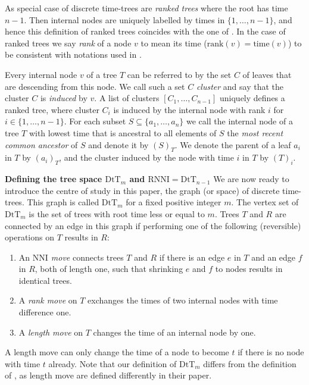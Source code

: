 \documentclass[11pt]{amsart}
\newcommand{\rnni}{\mathrm{RNNI}}
\newcommand{\rank}{\mathrm{rank}}
\newcommand{\ntime}{\mathrm{time}}
\newcommand{\nni}{\mathrm{NNI}}
\newcommand{\dtt}{\mathrm{DtT}}
\newcommand{\summary}[1]{\textbf{#1}} %
\begin{document}
As special case of discrete time-trees are \emph{ranked trees} where the root has time $n-1$.
Then internal nodes are uniquely labelled by times in $\{1, \ldots, n-1\}$, and hence this definition of ranked trees coincides with the one of \textcite{Collienne2020-iu}.
In the case of ranked trees we say \emph{rank} of a node $v$ to mean its time ($\rank(v) = \ntime(v)$) to be consistent with notations used in \autocite{Collienne2020-iu}.

Every internal node $v$ of a tree $T$ can be referred to by the set $C$ of leaves that are descending from this node.
We call such a set $C$ \emph{cluster} and say that the cluster $C$ is \emph{induced} by $v$.
A list of clusters $[C_1, \ldots, C_{n-1}]$ uniquely defines a ranked tree, where cluster $C_i$ is induced by the internal node with rank $i$ for $i \in \{1, \ldots, n-1\}$.
For each subset $S \subseteq \{a_1, \ldots, a_n\}$ we call the internal node of a tree $T$ with lowest time that is ancestral to all elements of $S$ the \emph{most recent common ancestor} of $S$ and denote it by $(S)_T$.
We denote the parent of a leaf $a_i$ in $T$ by $(a_i)_T$, and the cluster induced by the node with time $i$ in $T$ by $(T)_i$.

\summary{Defining the tree space $\dtt_m$ and $\rnni = \dtt_{n-1}$}
We are now ready to introduce the centre of study in this paper, the graph (or space) of discrete time-trees.
This graph is called $\dtt_m$ for a fixed positive integer $m$.
The vertex set of $\dtt_m$ is the set of trees with root time less or equal to $m$.
Trees $T$ and $R$ are connected by an edge in this graph if performing one of the following (reversible) operations on $T$ results in $R$:
\begin{enumerate}
	\item An \emph{$\nni$ move} connects trees $T$ and $R$ if there is an edge $e$ in $T$ and an edge $f$ in $R$, both of length one, such that shrinking $e$ and $f$ to nodes results in identical trees.
	\item A \emph{rank move} on $T$ exchanges the times of two internal nodes with time difference one.
	\item A \emph{length move} on $T$ changes the time of an internal node by one.
\end{enumerate}
A length move can only change the time of a node to become $t$ if there is no node with time $t$ already.
Note that our definition of $\dtt_m$ differs from the definition of \textcite{Gavryushkin2018-ol}, as length move are defined differently in their paper.
\end{document}
